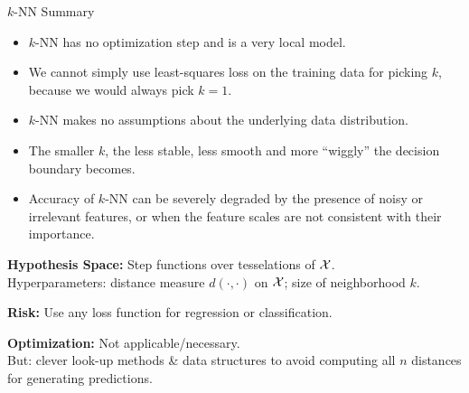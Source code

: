 \documentclass[11pt,compress,t,notes=noshow, xcolor=table]{beamer}
\begin{document}
\begin{vbframe}{$k$-NN Summary}

\begin{itemize}
\item $k$-NN has no optimization step and is a very local model.
\item We cannot simply use least-squares loss on the training data for picking $k$,
  because we would always pick $k=1$.
\item $k$-NN makes no assumptions about the underlying data distribution.
\item The smaller $k$, the less stable, less smooth and more \enquote{wiggly} the decision
  boundary becomes.
\item Accuracy of $k$-NN can be severely degraded by the presence of noisy or irrelevant features,
  or when the feature scales are not consistent with their importance.
\end{itemize}


\framebreak

\lz

\textbf{Hypothesis Space:} Step functions over tesselations of $\mathcal{X}$.\\
Hyperparameters: distance measure $d(\cdot,\cdot)$ on $\mathcal{X}$; size of neighborhood $k$.

\lz

\textbf{Risk:} Use any loss function for regression or classification.

\lz

\textbf{Optimization:} Not applicable/necessary.\\ But: clever look-up methods \& data structures to avoid computing all $n$ distances for generating predictions.

\end{vbframe}

\endlecture
\end{document}
